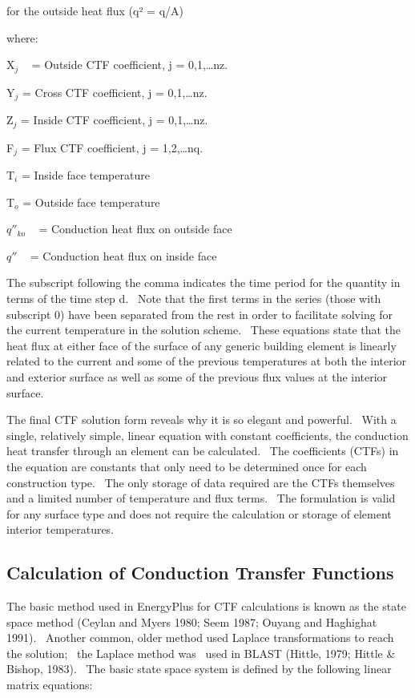 for the outside heat flux (q² = q/A)

where:

X\emph{\(_{j}\)} ~ = Outside CTF coefficient, j = 0,1,\ldots{}nz.

Y\emph{\(_{j}\)} = Cross CTF coefficient, j = 0,1,\ldots{}nz.

Z\emph{\(_{j}\)} = Inside CTF coefficient, j = 0,1,\ldots{}nz.

F\emph{\(_{j}\)} = Flux CTF coefficient, j = 1,2,\ldots{}nq.

T\emph{\(_{i}\)} = Inside face temperature

T\emph{\(_{o}\)} = Outside face temperature

\({q''_{ko}}\) ~ = Conduction heat flux on outside face

\(q''\) ~ = Conduction heat flux on inside face

The subscript following the comma indicates the time period for the quantity in terms of the time step d.~ Note that the first terms in the series (those with subscript 0) have been separated from the rest in order to facilitate solving for the current temperature in the solution scheme.~ These equations state that the heat flux at either face of the surface of any generic building element is linearly related to the current and some of the previous temperatures at both the interior and exterior surface as well as some of the previous flux values at the interior surface.

The final CTF solution form reveals why it is so elegant and powerful.~ With a single, relatively simple, linear equation with constant coefficients, the conduction heat transfer through an element can be calculated.~ The coefficients (CTFs) in the equation are constants that only need to be determined once for each construction type.~ The only storage of data required are the CTFs themselves and a limited number of temperature and flux terms.~ The formulation is valid for any surface type and does not require the calculation or storage of element interior temperatures.

\subsection{Calculation of Conduction Transfer Functions}\label{calculation-of-conduction-transfer-functions}

The basic method used in EnergyPlus for CTF calculations is known as the state space method (Ceylan and Myers 1980; Seem 1987; Ouyang and Haghighat 1991).~ Another common, older method used Laplace transformations to reach the solution;~ the Laplace method was~ used in BLAST (Hittle, 1979; Hittle \& Bishop, 1983).~ The basic state space system is defined by the following linear matrix equations:

